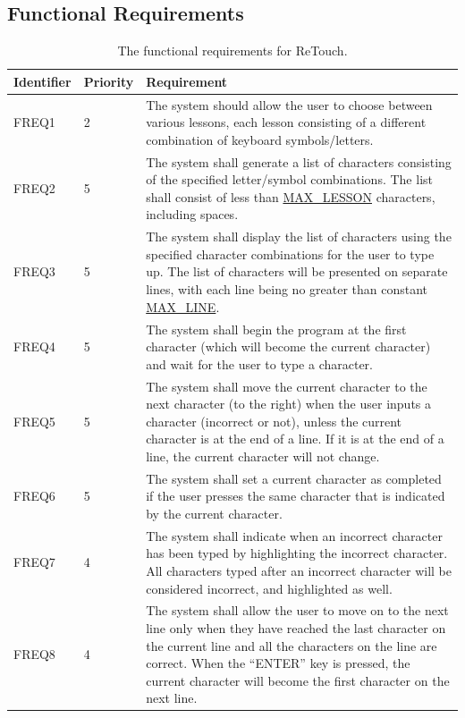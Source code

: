 \documentclass[12pt, titlepage]{article}
\begin{document}
\subsection{Functional Requirements}

\begin{longtable}{ |m{2cm}|m{1.8cm}|m{9.4cm}| }
\caption{The functional requirements for ReTouch.} \\
    \hline
    \textbf{Identifier} & \textbf{Priority} & \textbf{Requirement} \\ 
    \hline
    FREQ1 & 2 & The system should allow the user to choose between various lessons, each lesson consisting of a different combination of keyboard symbols/letters. \\ 
    \hline
    FREQ2 & 5 & The system shall generate a list of characters consisting of the specified letter/symbol combinations. The list shall consist of less than \hyperref[symbols]{MAX\_LESSON} characters, including spaces. \\ 
    \hline
    FREQ3 & 5 & The system shall display the list of characters using the specified character combinations for the user to type up. The list of characters will be presented on separate lines, with each line being no greater than constant \hyperref[symbols]{MAX\_LINE}.  \\ 
    \hline
    FREQ4 & 5 & The system shall begin the program at the first character (which will become the current character) and wait for the user to type a character. \\ 
    \hline
    FREQ5 & 5 & The system shall move the current character to the next character (to the right) when the user inputs a character (incorrect or not), unless the current character is at the end of a line. If it is at the end of a line, the current character will not change.   \\ 
    \hline
    FREQ6 & 5 & The system shall set a current character as completed if the user presses the same character that is indicated by the current character. \\ 
    \hline
    FREQ7 & 4 & The system shall indicate when an incorrect character has been typed by highlighting the incorrect character. All characters typed after an incorrect character will be considered incorrect, and highlighted as well. \\ 
    \hline
    FREQ8 & 4 & The system shall allow the user to move on to the next line only when they have reached the last character on the current line and all the characters on the line are correct. When the “ENTER” key is pressed, the current character will become the first character on the next line. \\ 

\end{longtable}
\end{document}
